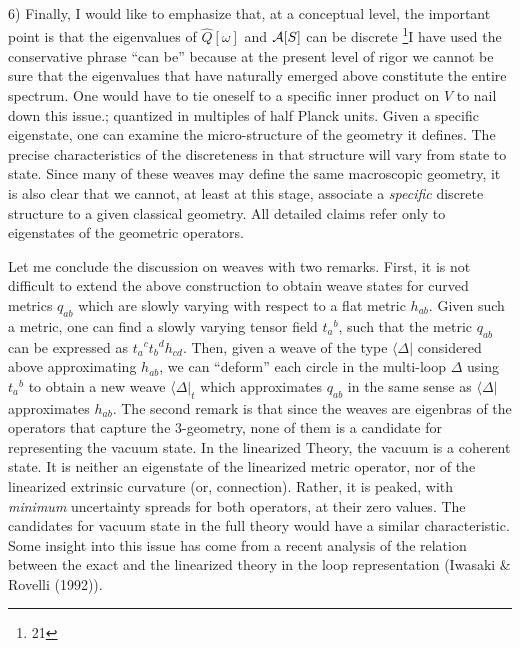 \item{6)} {Finally, I would like to emphasize that, at a conceptual level,
the important point is that the eigenvalues of $\hat{Q}[\omega ]$ and
${\cal A}[S]$ can be discrete%
\footnote{21}{I have used the conservative phrase ``can be'' because
at the present level of rigor we cannot be sure that the eigenvalues that
have naturally emerged above constitute the entire spectrum. One would have
to tie oneself to a specific inner product on $V$ to nail down this issue.};
quantized in multiples of half Planck units. Given a specific eigenstate, one
can examine the micro-structure of the geometry it defines. The precise
characteristics of the discreteness in that structure will vary from state
to state. Since many of these weaves may define the same macroscopic geometry,
it is also clear that we cannot, at least at this stage, associate a {\it
specific} discrete structure to a given classical geometry. All detailed
claims refer only to eigenstates of the geometric operators.}

Let me conclude the discussion on weaves with two remarks. First, it is not
difficult to extend the above construction to obtain weave states for curved
metrics $q_{ab}$ which are slowly varying with respect to a flat metric
$h_{ab}$. Given such a metric, one can find a slowly varying tensor field
$t_a{}^b$, such that the metric $q_{ab}$ can be expressed as $t_a{}^c
t_b{}^d h_{cd}$. Then, given a weave of the type $\langle\Delta|$ considered
above approximating $h_{ab}$, we can ``deform'' each circle in the multi-loop
$\Delta$ using $t_a{}^b$ to obtain a new weave $\langle \Delta |_{t}$ which
approximates $q_{ab}$ in the same sense as $\langle\Delta|$ approximates
$h_{ab}$. The second remark is that since the weaves are eigenbras of the
operators that capture the 3-geometry, none of them is a candidate for
representing the vacuum state. In the linearized Theory, the vacuum is a
coherent state. It is neither an eigenstate of the linearized metric operator,
nor of the linearized extrinsic curvature (or, connection). Rather, it is
peaked, with {\it minimum} uncertainty spreads for both operators, at their
zero values. The candidates for vacuum state in the full theory would have a
similar characteristic. Some insight into this issue has come from a recent
analysis of the relation between the exact and the linearized theory in the
loop representation (Iwasaki \& Rovelli (1992)).

